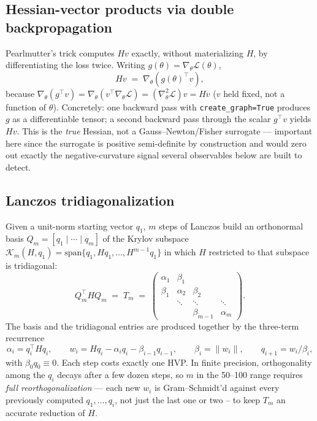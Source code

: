 \documentclass[11pt]{article}
\newcommand{\code}[1]{\texttt{#1}}
\begin{document}
\subsection{Hessian-vector products via double backpropagation}
\label{sec:hvp}

Pearlmutter's trick computes \(Hv\) exactly, without materializing \(H\),
by differentiating the loss twice. Writing \(g(\theta) = \nabla_\theta
\mathcal{L}(\theta)\),
\[
Hv \;=\; \nabla_\theta\!\left(g(\theta)^\top v\right),
\]
because \(\nabla_\theta (g^\top v) = \nabla_\theta\!\left(v^\top \nabla_\theta
\mathcal{L}\right) = (\nabla^2_\theta \mathcal{L}) v = Hv\) (\(v\) held
fixed, not a function of \(\theta\)). Concretely: one backward pass with
\code{create_graph=True} produces \(g\) as a differentiable tensor; a second
backward pass through the scalar \(g^\top v\) yields \(Hv\). This is the
\emph{true} Hessian, not a Gauss--Newton/Fisher surrogate ---
important here since the surrogate is positive semi-definite by
construction and would zero out exactly the negative-curvature signal
several observables below are built to detect.

\subsection{Lanczos tridiagonalization}
\label{sec:lanczos}

Given a unit-norm starting vector \(q_1\), \(m\) steps of Lanczos build an
orthonormal basis \(Q_m = [q_1 \mid \cdots \mid q_m]\) of the Krylov
subspace \(\mathcal{K}_m(H, q_1) = \mathrm{span}\{q_1, Hq_1, \dots,
H^{m-1}q_1\}\) in which \(H\) restricted to that subspace is tridiagonal:
\[
Q_m^\top H Q_m \;=\; T_m \;=\;
\begin{pmatrix}
\alpha_1 & \beta_1 & & \\
\beta_1 & \alpha_2 & \beta_2 & \\
 & \ddots & \ddots & \ddots \\
 & & \beta_{m-1} & \alpha_m
\end{pmatrix}.
\]
The basis and the tridiagonal entries are produced together by the
three-term recurrence
\[
\alpha_i = q_i^\top H q_i, \qquad
w_i = Hq_i - \alpha_i q_i - \beta_{i-1} q_{i-1}, \qquad
\beta_i = \lVert w_i \rVert, \qquad
q_{i+1} = w_i / \beta_i,
\]
with \(\beta_0 q_0 \equiv 0\). Each step costs exactly one HVP. In finite
precision, orthogonality among the \(q_i\) decays after a few dozen steps,
so \(m\) in the 50--100 range requires \emph{full reorthogonalization} ---
each new \(w_i\) is Gram--Schmidt'd against every previously computed
\(q_1,\dots,q_i\), not just the last one or two -- to keep \(T_m\) an
accurate reduction of \(H\).
\end{document}
